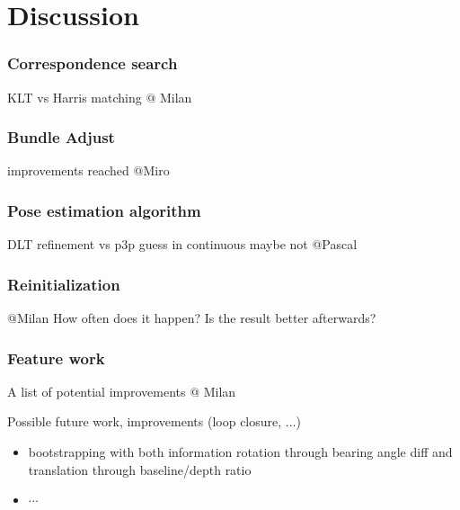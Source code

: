 \section{Discussion}

\subsubsection{Correspondence search}
KLT vs Harris matching
@ Milan

\subsubsection{Bundle Adjust}
improvements reached
@Miro

\subsubsection{Pose estimation algorithm}
DLT refinement vs p3p guess in continuous  maybe not
@Pascal

\subsubsection{Reinitialization}
@Milan
How often does it happen? Is the result better afterwards?

\subsubsection{Feature work}
A list of potential improvements
@ Milan

Possible future work, improvements (loop closure, ...)

\begin{itemize}
\item bootstrapping with both information rotation through bearing angle diff and translation through baseline/depth ratio
\item $\cdots$
\end{itemize}
